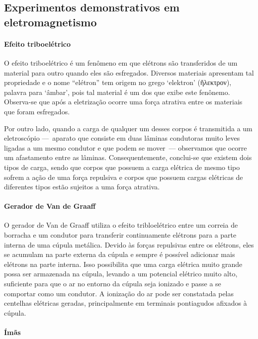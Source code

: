 \subsection{Experimentos demonstrativos em eletromagnetismo}

\paragraph{Efeito triboelétrico}

O efeito triboelétrico é um fenômeno em que elétrons são transferidos de um material para outro quando eles são esfregados. Diversos materiais apresentam tal propriedade e o nome ``elétron'' tem origem no grego `elektron' (ἤλεκτρον), palavra para `âmbar', pois tal material é um dos que exibe este fenônemo. Observa-se que após a eletrização ocorre uma força atrativa entre os materiais que foram esfregados.

Por outro lado, quando a carga de qualquer um desses corpos é transmitida a um eletroscópio ---~aparato que consiste em duas lâminas condutoras muito leves ligadas a um mesmo condutor e que podem se mover~--- observamos que ocorre um afastamento entre as lâminas. Consequentemente, conclui-se que existem dois tipos de carga, sendo que corpos que possuem a carga elétrica de mesmo tipo sofrem a ação de uma força repulsiva e corpos que possuem cargas elétricas de diferentes tipos estão sujeitos a uma força atrativa.

\paragraph{Gerador de Van de Graaff}

O gerador de Van de Graaff utiliza o efeito tribloelétrico entre um correia de borracha e um condutor para transferir continuamente elétrons para a parte interna de uma cúpula metálica. Devido às forças repulsivas entre os elétrons, eles se acumulam na parte externa da cúpula e sempre é possível adicionar mais elétrons na parte interna. Isso possibilita que uma carga elétrica muito grande possa ser armazenada na cúpula, levando a um potencial elétrico muito alto, suficiente para que o ar no entorno da cúpula seja ionizado e passe a se comportar como um condutor. A ionização do ar pode ser constatada pelas centelhas elétricas geradas, principalmente em terminais pontiagudos afixados à cúpula.

\paragraph{Ímãs}

